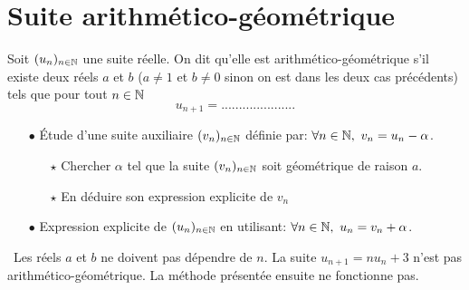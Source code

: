 \documentclass[a4paper, 11pt]{article}
\begin{document}
\newpage
\section{Suite arithm\'etico-g\'eom\'etrique}


{  

\begin{defi} Soit $(u_n)_{n\in \mathbb{N}}$ une suite r\'eelle. On dit qu'elle est arithm\'etico-g\'eom\'etrique s'il existe deux r\'eels $a$ et $b$ ($a\not=1$ et $b\not=0$ sinon on est dans les deux cas pr\'ec\'edents) tels que pour tout $n\in\mathbb{N}$
$$ u_{n+1}=.....................$$
\vspace{0.1cm}
\end{defi}

}\vspace{0.3cm}



\setlength\fboxrule{1pt}
 {
\begin{minipage}[t]{0.9\textwidth}
\begin{itemize}
\item[$\bullet$] \'Etude d'une suite auxiliaire $(v_n)_{n\in \mathbb{N}}$ d\'efinie par: $\forall n\in\mathbb{N},\ v_n=u_n-\alpha$.
\begin{itemize}
\item[$\star$]Chercher $\alpha$  tel que la suite $(v_n)_{n\in \mathbb{N}}$ soit g\'eom\'etrique de raison $a$.
\item[$\star$] En d\'eduire son expression explicite de $v_n$
\end{itemize}
\item[$\bullet$] Expression explicite de $(u_n)_{n\in \mathbb{N}}$ en utilisant: $\forall n\in\N,\ u_n=v_n+\alpha$. 
\end{itemize}
\end{minipage}}
\setlength\fboxrule{0.5pt}
\begin{rem}
\warning \, Les r\'eels $a$ et $b$ ne doivent pas d\'ependre de $n$. La suite $u_{n+1}= nu_n+3$ n'est pas arithmético-géométrique. La méthode présentée ensuite ne fonctionne pas. 
\end{rem}
\end{document}
